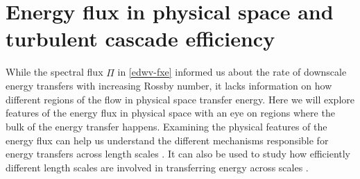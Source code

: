 \documentclass[../Rajarshi-thesis-draft.tex]{subfiles}
\begin{document}
    
    
    
	
\section{ Energy flux in physical space and turbulent cascade efficiency }\label{edwv-flux}
    
	
  
	While the spectral flux $\hat{\Pi}$ in \eqref{edwv-fxe} informed us about the rate of downscale energy transfers with increasing Rossby number, it lacks information on how different regions of the flow in physical space transfer energy. Here we will explore features of the energy flux in physical space with an eye on regions where the bulk of the energy transfer happens.  Examining the physical features of the energy flux can help us  understand the different mechanisms responsible for energy transfers across length scales \citep{Alexakis_Chibbaro_2020, Dubrulle_2019,johnson2021, TV22, delpech_etal_2024, THR26}. It can also be used to study how efficiently different length scales are involved in transferring energy across scales \citep{ballouz2018,johnson2021}. 
	
	
\end{document}
